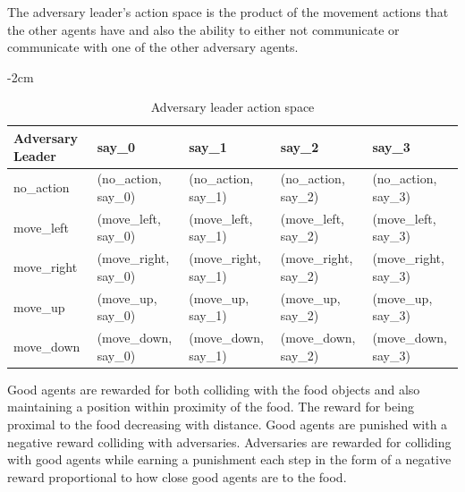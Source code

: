 \documentclass{article}
\begin{document}
  The adversary leader's action space is the product of the movement actions that the other agents have and also the ability to either not communicate or communicate with one of the other adversary agents.

\begin{table}[!ht]
  \centering
  \addtolength{\leftskip} {-2cm}
  \addtolength{\rightskip}{-2cm}
  \begin{tabular}{|l|l|l|l|l|}
    \hline
    Adversary Leader  & say\_0                & say\_1                & say\_2                & say\_3                \\ \hline
    no\_action  & (no\_action, say\_0)  & (no\_action, say\_1)  & (no\_action, say\_2)  & (no\_action, say\_3)  \\ \hline
    move\_left  & (move\_left, say\_0)  & (move\_left, say\_1)  & (move\_left, say\_2)  & (move\_left, say\_3)  \\ \hline
    move\_right & (move\_right, say\_0) & (move\_right, say\_1) & (move\_right, say\_2) & (move\_right, say\_3) \\ \hline
    move\_up    & (move\_up, say\_0)    & (move\_up, say\_1)    & (move\_up, say\_2)    & (move\_up, say\_3)    \\ \hline
    move\_down  & (move\_down, say\_0)  & (move\_down, say\_1)  & (move\_down, say\_2)  & (move\_down, say\_3)  \\ \hline
    \end{tabular}
    \caption{Adversary leader action space}
    \label{tab:adversary-leader-action}
  \end{table}

  Good agents are rewarded for both colliding with the food objects and also maintaining a position within proximity of the food.
  The reward for being proximal to the food decreasing with distance.
  Good agents are punished with a negative reward colliding with adversaries.
  Adversaries are rewarded for colliding with good agents while earning a punishment each step in the form of a negative reward proportional to how close good agents are to the food.
\end{document}
